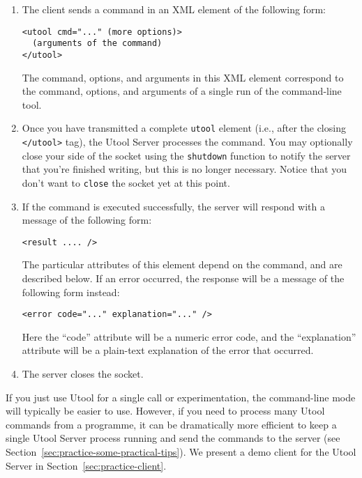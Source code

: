 \begin{enumerate}
\item The client sends a command in an XML element of the following
form: 
\begin{verbatim}
<utool cmd="..." (more options)>
  (arguments of the command)
</utool>
\end{verbatim}

The command, options, and arguments in this XML element correspond to
the command, options, and arguments of a single run of the
command-line tool.


\item Once you have transmitted a complete \verb|utool| element (i.e., after the closing \verb|</utool>| tag), the Utool Server processes the command. You may optionally close your side of the socket using the \verb?shutdown? function to notify the server that you're finished writing, but this is no longer necessary. Notice that you don't want to \verb?close? the socket yet at this point.

\item If the command is executed successfully, the server will respond
with a message of the following form:

\begin{verbatim}
<result .... />
\end{verbatim}

The particular attributes of this element depend on the command, and
are described below. If an error occurred, the response will be a
message of the following form instead:

\begin{verbatim}
<error code="..." explanation="..." />
\end{verbatim}

Here the ``code'' attribute will be a numeric error code, and the
``explanation'' attribute will be a plain-text explanation of the
error that occurred.

\item The server closes the socket.
\end{enumerate}


If you just use Utool for a single call or experimentation, the
command-line mode will typically be easier to use. However, if you
need to process many Utool commands from a programme, it can be
dramatically more efficient to keep a single Utool Server process
running and send the commands to the server (see
Section~\ref{sec:practice-some-practical-tips}). We present a demo
client for the Utool Server in Section~\ref{sec:practice-client}.

